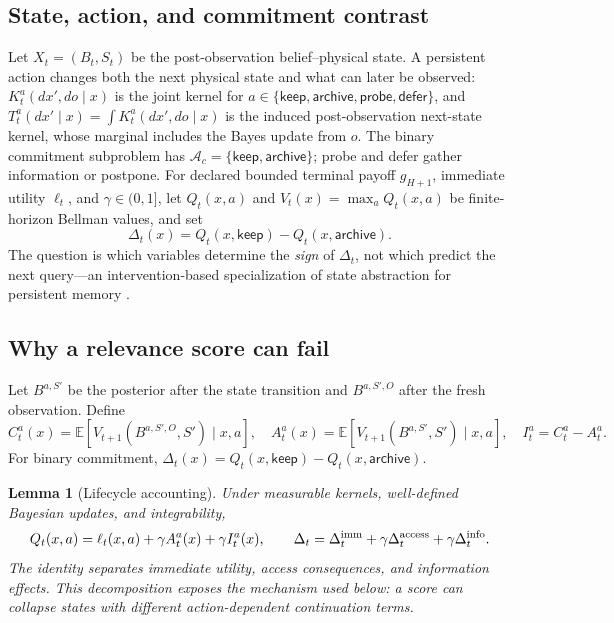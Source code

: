 \documentclass{article}
\newtheorem{lemma}{Lemma}
\newcommand{\keep}{\mathsf{keep}}
\newcommand{\archive}{\mathsf{archive}}
\newcommand{\probe}{\mathsf{probe}}
\newcommand{\defer}{\mathsf{defer}}
\newcommand{\E}{\mathbb{E}}
\begin{document}
\subsection{State, action, and commitment contrast}
Let $X_t=(B_t,S_t)$ be the post-observation belief--physical state. A persistent
action changes both the next physical state and what can later be observed:
$K_t^a(dx',do\mid x)$ is the joint kernel for
$a\in\{\keep,\archive,\probe,\defer\}$, and
$T_t^a(dx'\mid x)=\int K_t^a(dx',do\mid x)$ is the induced post-observation
next-state kernel, whose marginal includes the Bayes update from $o$. The binary
commitment subproblem has $\mathcal A_c=\{\keep,\archive\}$; probe and defer gather
information or postpone. For declared bounded terminal payoff $g_{H+1}$, immediate
utility $\ell_t$, and $\gamma\in(0,1]$, let $Q_t(x,a)$ and $V_t(x)=\max_aQ_t(x,a)$
be finite-horizon Bellman values, and set
\begin{equation}
\Delta_t(x)=Q_t(x,\keep)-Q_t(x,\archive).
\label{eq:contrast}
\end{equation}
The question is which variables determine the \emph{sign} of $\Delta_t$, not which
predict the next query---an intervention-based specialization of state abstraction
for persistent memory \citep{li2006abstraction,abel2020abstraction}.

\subsection{Why a relevance score can fail}
Let $B^{a,S'}$ be the posterior after the state transition and $B^{a,S',O}$ after the fresh observation. Define
\begin{equation}
C_t^a(x)=\E[V_{t+1}(B^{a,S',O},S')\mid x,a],\quad
A_t^a(x)=\E[V_{t+1}(B^{a,S'},S')\mid x,a],\quad I_t^a=C_t^a-A_t^a.
\end{equation}
For binary commitment, $\Delta_t(x)=Q_t(x,\keep)-Q_t(x,\archive)$.
\begin{lemma}[Lifecycle accounting]
Under measurable kernels, well-defined Bayesian updates, and integrability,
\begin{equation}
Q_t(x,a)=\ell_t(x,a)+\gamma A_t^a(x)+\gamma I_t^a(x),\qquad
\Delta_t=\Delta_t^{\rm imm}+\gamma\Delta_t^{\rm access}+\gamma\Delta_t^{\rm info}.
\end{equation}
The identity separates immediate utility, access consequences, and information effects. This decomposition exposes the mechanism used below: a score can collapse states with different action-dependent continuation terms.
\end{lemma}
\end{document}
